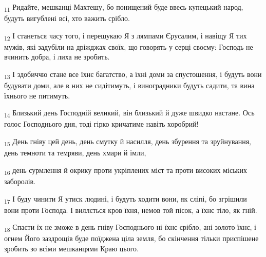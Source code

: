 \begin{tcolorbox}
\textsubscript{11} Ридайте, мешканці Махтешу, бо понищений буде ввесь купецький народ, будуть вигублені всі, хто важить срібло.
\end{tcolorbox}
\begin{tcolorbox}
\textsubscript{12} І станеться часу того, і перешукаю Я з лямпами Єрусалим, і навіщу Я тих мужів, які задубіли на дріжджах своїх, що говорять у серці своєму: Господь не вчинить добра, і лиха не зробить.
\end{tcolorbox}
\begin{tcolorbox}
\textsubscript{13} І здобиччю стане все їхнє багатство, а їхні доми за спустошення, і будуть вони будувати доми, але в них не сидітимуть, і виноградники будуть садити, та вина їхнього не питимуть.
\end{tcolorbox}
\begin{tcolorbox}
\textsubscript{14} Близький день Господній великий, він близький й дуже швидко настане. Ось голос Господнього дня, тоді гірко кричатиме навіть хоробрий!
\end{tcolorbox}
\begin{tcolorbox}
\textsubscript{15} День гніву цей день, день смутку й насилля, день збурення та зруйнування, день темноти та темряви, день хмари й імли,
\end{tcolorbox}
\begin{tcolorbox}
\textsubscript{16} день сурмлення й окрику проти укріплених міст та проти високих міських заборолів.
\end{tcolorbox}
\begin{tcolorbox}
\textsubscript{17} І буду чинити Я утиск людині, і будуть ходити вони, як сліпі, бо згрішили вони проти Господа. І виллється кров їхня, немов той пісок, а їхнє тіло, як гній.
\end{tcolorbox}
\begin{tcolorbox}
\textsubscript{18} Спасти їх не зможе в день гніву Господнього ні їхнє срібло, ані золото їхнє, і огнем Його заздрощів буде поїджена ціла земля, бо скінчення тільки приспішене зробить зо всіми мешканцями Краю цього.
\end{tcolorbox}
